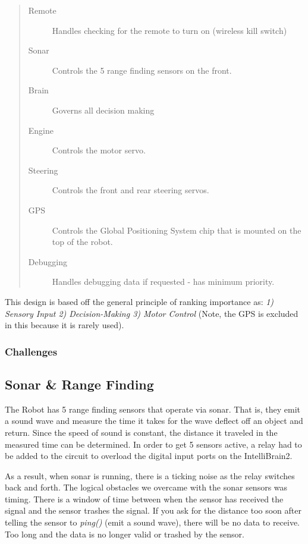 \documentclass[12pt]{article}
\begin{document}
\begin{quote}
\begin{description}
\item[Remote] Handles checking for the remote to turn on (wireless kill switch)
\item[Sonar] Controls the 5 range finding sensors on the front.
\item[Brain] Governs all decision making
\item[Engine] Controls the motor servo.
\item[Steering] Controls the front and rear steering servos.
\item[GPS] Controls the Global Positioning System chip that is mounted on the top of the robot.
\item[Debugging] Handles debugging data if requested - has minimum priority.
\end{description}
\end{quote}

This design is based off the general principle of ranking importance as: \textit{1) Sensory Input 2) Decision-Making 3) Motor Control}  (Note, the GPS is excluded in this because it is rarely used).

\subsubsection{Challenges}

\clearpage
\subsection{Sonar \& Range Finding}
The Robot has 5 range finding sensors that operate via sonar.  That is, they emit a sound wave and measure the time it takes for the wave deflect off an object and return.  Since the speed of sound is constant, the distance it traveled in the measured time can be determined.  In order to get 5 sensors active, a relay had to be added to the circuit to overload the digital input ports on the IntelliBrain2.

	As a result, when sonar is running, there is a ticking noise as the relay switches back and forth.  The logical obstacles we overcame with the sonar sensors was timing.  There is a window of time between when the sensor has received the signal and the sensor trashes the signal.  If you ask for the distance too soon after telling the sensor to \textit{ping()} (emit a sound wave), there will be no data to receive.  Too long and the data is no longer valid or trashed by the sensor.
\end{document}
